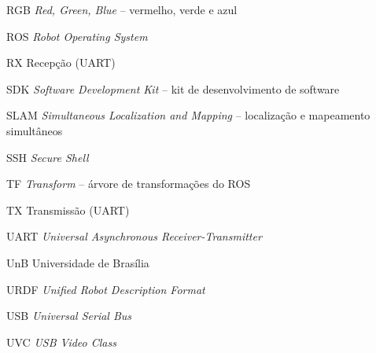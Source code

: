 \begin{siglas}
  \item[RGB] \textit{Red, Green, Blue} -- vermelho, verde e azul
  \item[ROS] \textit{Robot Operating System}
  \item[RX] Recepção (UART)
  \item[SDK] \textit{Software Development Kit} -- kit de desenvolvimento de software
  \item[SLAM] \textit{Simultaneous Localization and Mapping} -- localização e mapeamento simultâneos
  \item[SSH] \textit{Secure Shell}
  \item[TF] \textit{Transform} -- árvore de transformações do ROS
  \item[TX] Transmissão (UART)
  \item[UART] \textit{Universal Asynchronous Receiver-Transmitter}
  \item[UnB] Universidade de Brasília
  \item[URDF] \textit{Unified Robot Description Format}
  \item[USB] \textit{Universal Serial Bus}
  \item[UVC] \textit{USB Video Class}
\end{siglas}
